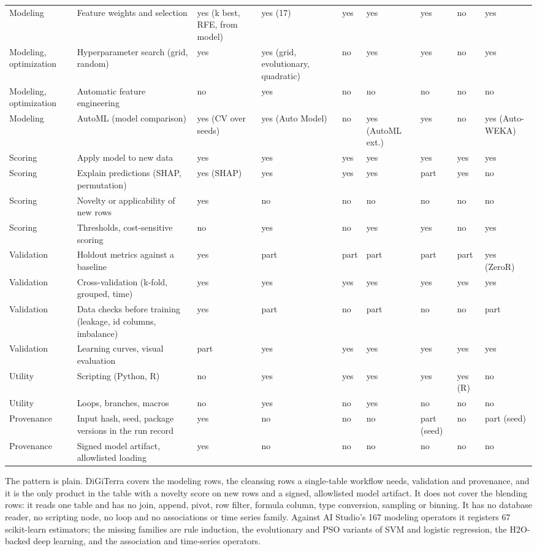 {\begin{longtable}{@{}L{2.4cm}L{3.9cm}L{1.35cm}L{1.35cm}L{1.05cm}L{1.05cm}L{1.35cm}L{1.05cm}L{1.35cm}@{}}
Modeling & Feature weights and selection & yes (k best, RFE, from model) & yes (17) & yes & yes & yes & no & yes \\
Modeling, optimization & Hyperparameter search (grid, random) & yes & yes (grid, evolutionary, quadratic) & no & yes & yes & no & yes \\
Modeling, optimization & Automatic feature engineering & no & yes & no & no & no & no & no \\
Modeling & AutoML (model comparison) & yes (CV over seeds) & yes (Auto Model) & no & yes (AutoML ext.) & yes & no & yes (Auto-WEKA) \\
Scoring & Apply model to new data & yes & yes & yes & yes & yes & yes & yes \\
Scoring & Explain predictions (SHAP, permutation) & yes (SHAP) & yes & yes & yes & part & yes & no \\
Scoring & Novelty or applicability of new rows & yes & no & no & no & no & no & no \\
Scoring & Thresholds, cost-sensitive scoring & no & yes & no & yes & yes & no & yes \\
Validation & Holdout metrics against a baseline & yes & part & part & part & part & part & yes (ZeroR) \\
Validation & Cross-validation (k-fold, grouped, time) & yes & yes & yes & yes & yes & yes & yes \\
Validation & Data checks before training (leakage, id columns, imbalance) & yes & part & no & part & no & no & part \\
Validation & Learning curves, visual evaluation & part & yes & yes & yes & yes & yes & yes \\
Utility & Scripting (Python, R) & no & yes & yes & yes & yes & yes (R) & no \\
Utility & Loops, branches, macros & no & yes & no & yes & no & no & no \\
Provenance & Input hash, seed, package versions in the run record & yes & no & no & no & part (seed) & no & part (seed) \\
Provenance & Signed model artifact, allowlisted loading & yes & no & no & no & no & no & no \\
\bottomrule
\end{longtable}}

The pattern is plain. DiGiTerra covers the modeling rows, the cleansing rows a single-table workflow needs, validation and provenance, and it is the only product in the table with a novelty score on new rows and a signed, allowlisted model artifact. It does not cover the blending rows: it reads one table and has no join, append, pivot, row filter, formula column, type conversion, sampling or binning. It has no database reader, no scripting node, no loop and no associations or time series family. Against AI Studio's 167 modeling operators it registers 67 scikit-learn estimators; the missing families are rule induction, the evolutionary and PSO variants of SVM and logistic regression, the H2O-backed deep learning, and the association and time-series operators.

